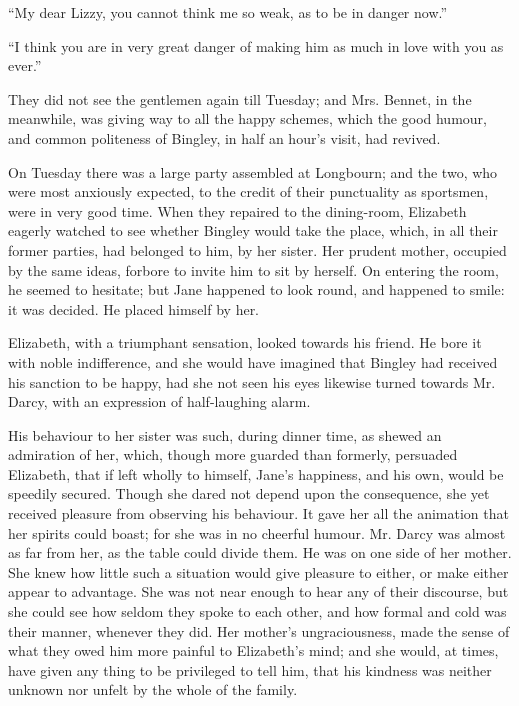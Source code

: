 “My dear Lizzy, you cannot think me so weak, as to
be in danger now.”

“I think you are in very great danger of making him
as much in love with you as ever.”

\strut

They did not see the gentlemen again till Tuesday;
and Mrs. Bennet, in the meanwhile, was giving way to all
the happy schemes, which the good humour, and common
politeness of Bingley, in half an hour’s visit, had revived.

On Tuesday there was a large party assembled at Longbourn;
and the two, who were most anxiously expected,
to the credit of their punctuality as sportsmen, were in
very good time. When they repaired to the dining-room,
Elizabeth eagerly watched to see whether Bingley
would take the place, which, in all their former parties,
had belonged to him, by her sister. Her prudent mother,
occupied by the same ideas, forbore to invite him to sit
by herself. On entering the room, he seemed to hesitate;
but Jane happened to look round, and happened to smile:
it was decided. He placed himself by her.

Elizabeth, with a triumphant sensation, looked towards
his friend. He bore it with noble indifference, and she
would have imagined that Bingley had received his
sanction to be happy, had she not seen his eyes likewise
turned towards Mr. Darcy, with an expression of half-laughing
alarm.

His behaviour to her sister was such, during dinner
time, as shewed an admiration of her, which, though more
guarded than formerly, persuaded Elizabeth, that if left
wholly to himself, Jane’s happiness, and his own, would
be speedily secured. Though she dared not depend upon
the consequence, she yet received pleasure from observing
his behaviour. It gave her all the animation that her
spirits could boast; for she was in no cheerful humour.
Mr. Darcy was almost as far from her, as the table could
divide them. He was on one side of her mother. She
knew how little such a situation would give pleasure to
either, or make either appear to advantage. She was not
near enough to hear any of their discourse, but she could
see how seldom they spoke to each other, and how formal
and cold was their manner, whenever they did. Her
mother’s ungraciousness, made the sense of what they
owed him more painful to Elizabeth’s mind; and she
would, at times, have given any thing to be privileged to
tell him, that his kindness was neither unknown nor unfelt
by the whole of the family.

